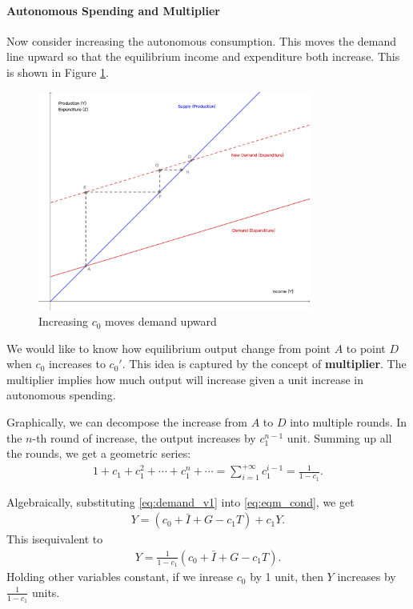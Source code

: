 \documentclass[12pt]{article}
\numberwithin{equation}{section}
\begin{document}
\paragraph{Autonomous Spending and Multiplier}
Now consider increasing the autonomous consumption. This moves the demand line upward so that the equilibrium income and expenditure both increase. This is shown in Figure \ref{fig:key_cross_v2}.

\begin{figure}[htp]
    \centering
    \includegraphics[width=0.8\textwidth]{keynesian_cross_c0change.png}
    \caption{Increasing $c_0$ moves demand upward}
    \label{fig:key_cross_v2}
\end{figure}

We would like to know how equilibrium output change from point $A$ to point $D$ when $c_0$ increases to $c_0'$. This idea is captured by the concept of \textbf{multiplier}. The multiplier implies how much output will increase given a unit increase in autonomous spending. 

Graphically, we can decompose the increase from $A$ to $D$ into multiple rounds. In the $n$-th round of increase, the output increases by $c_1^{n-1}$ unit. Summing up all the rounds, we get a geometric series:
\begin{align*}
    1 + c_1 + c_1^2 + \cdots + c_1^n + \cdots = \sum_{i=1}^{+\infty} c_1^{i-1} = \frac{1}{1-c_1}.
\end{align*}

Algebraically, substituting \eqref{eq:demand_v1} into \eqref{eq:eqm_cond}, we get
\begin{align*}
    Y = (c_0 + \bar{I} + G - c_1T) + c_1Y.
\end{align*}
This isequivalent to
\begin{align*}
    Y = \frac{1}{1-c_1} (c_0 + \bar{I} + G - c_1T).
\end{align*}
Holding other variables constant, if we inrease $c_0$ by 1 unit, then $Y$ increases by $\frac{1}{1-c_1}$ units.
\end{document}
